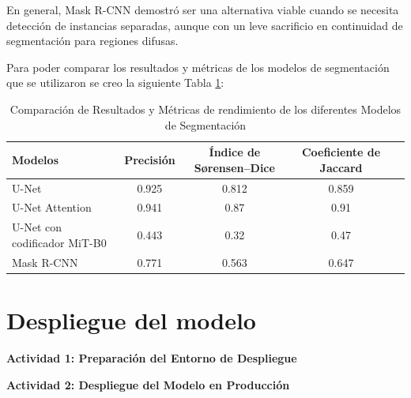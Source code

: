 \begin{enumerate}
\begin{itemize}
  
  
  \end{itemize}
  
  \vspace{0.2cm}
  En general, Mask R-CNN demostró ser una alternativa viable cuando se necesita detección de instancias separadas, aunque con un leve sacrificio en continuidad de segmentación para regiones difusas.
  


\end{enumerate}

Para poder comparar los resultados y métricas de los modelos de segmentación que se utilizaron se creo la siguiente Tabla \ref{tab:result_models}:
\begin{table}[H]
  \centering
  \caption{Comparación de Resultados y Métricas de rendimiento de los diferentes Modelos de Segmentación}
  \renewcommand{\arraystretch}{1.2} %
  \setlength{\tabcolsep}{5pt} %
  \begin{tabularx}{\textwidth}{@{}X c c c c@{}}
      \toprule
      \textbf{Modelos} & \textbf{Precisión} & \textbf{Índice de Sørensen–Dice} & \textbf{Coeficiente de Jaccard} \\ \midrule
      U-Net & 0.925 & 0.812 & 0.859  \\
      U-Net Attention & 0.941 & 0.87 & 0.91  \\
      U-Net con codificador MiT-B0 & 0.443 & 0.32 & 0.47  \\
      Mask R-CNN & 0.771 & 0.563 & 0.647  \\ 
      \bottomrule
  \end{tabularx}
  \label{tab:result_models}
\end{table}




\section{Despliegue del modelo}
\textbf{Actividad 1: Preparación del Entorno de Despliegue}

\textbf{Actividad 2: Despliegue del Modelo en Producción}

